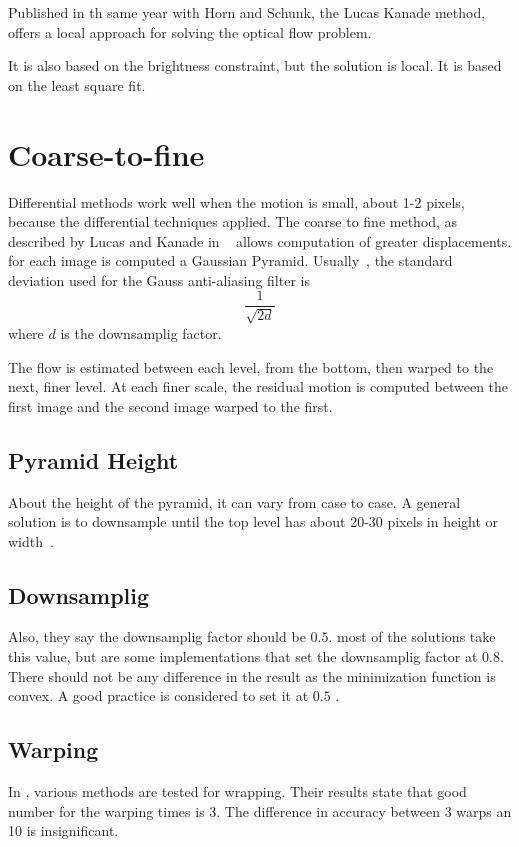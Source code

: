 \documentclass[12pt,a4paper,twoside]{report}
\begin{document}
Published in th same year with Horn and Schunk, the Lucas Kanade method, offers a local approach for solving the optical flow problem. 

It is also based on the brightness constraint, but the solution is local.
It is based on the least square fit.

\section{Coarse-to-fine}
Differential methods work well when the motion is small, about 1-2 pixels, because the differential techniques applied.
The coarse to fine method, as described by Lucas and Kanade in ~\cite{lucas1981} allows computation of greater displacements. for each image is computed a Gaussian Pyramid. Usually~\cite{sun2010}, the standard deviation used for the Gauss anti-aliasing filter is 
\begin{equation}
	\frac{1}{\sqrt{2d}}
\end{equation} where $d$ is the downsamplig factor.

The flow is estimated between each level, from the bottom, then warped to the next, finer level. At each finer scale, the residual motion is computed between the first image and the second image warped to the first. 

\subsection{Pyramid Height} \label{pyrHeight} About the height of the pyramid, it can vary from case to case. A general solution is to downsample until the top level has about 20-30 pixels in height or width~\cite{sun2010}. 

\subsection{Downsamplig}Also, they say the downsamplig factor should be $0.5$. most of the solutions take this value, but are some implementations that set the downsamplig factor at $0.8$. There should not be any difference in the result as the minimization function is convex. A good practice is considered to set it at $0.5$ \cite{sun2010}.



\subsection{Warping}In \cite{sun2010}, various methods are tested for wrapping. Their results state that good number for the warping times is 3. The difference in accuracy between 3 warps an 10 is insignificant.
\end{document}
